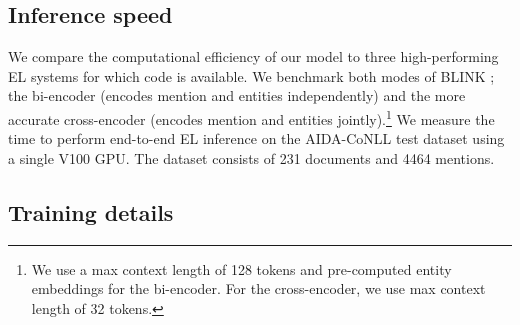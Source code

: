 \documentclass[11pt]{article}
\begin{document}
\subsection{Inference speed}
We compare the computational efficiency of our model to three high-performing EL systems \citep{wu-etal-2020-scalable, Cao2020AutoregressiveER, Orr2021BootlegCT} for which code is available. We benchmark both modes of BLINK \citep{wu-etal-2020-scalable}; the bi-encoder (encodes mention and entities independently) and the more accurate cross-encoder (encodes mention and entities jointly).\footnote{We use a max context length of 128 tokens and pre-computed entity embeddings for the bi-encoder. For the cross-encoder, we use max context length of 32 tokens.} We measure the time to perform end-to-end EL inference on the AIDA-CoNLL test dataset using a single V100 GPU. The dataset consists of 231 documents and 4464 mentions.

\subsection{Training details}
\end{document}
